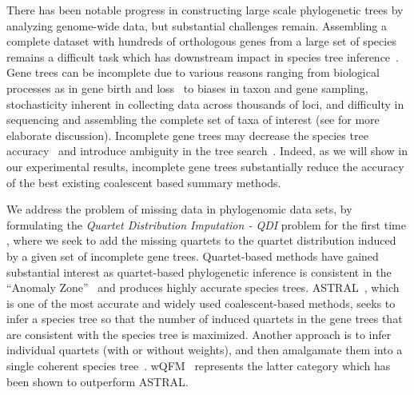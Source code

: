\documentclass[10pt,a4paper]{article}
\newcommand{\add}[1]{{\color{blue} #1}}
\begin{document}
There has been notable progress in constructing large scale phylogenetic trees by analyzing genome-wide data, but substantial challenges remain. Assembling a complete dataset with hundreds of orthologous genes from a large set of species remains a difficult task which has downstream impact in species tree inference~\cite{hosner2016avoiding,streicher2016should,xi2016impact}. Gene trees can be incomplete due to various reasons ranging from biological processes as in gene birth and loss~\cite{mgd-amb} to biases in taxon and gene sampling, stochasticity inherent in collecting data across thousands of loci, and difficulty in sequencing and assembling the complete set of taxa of interest (see \cite{hosner2016avoiding,streicher2016should,lemmon2009effect,burleigh2009inferring} for more elaborate discussion). Incomplete gene trees may decrease the species tree accuracy~\cite{bayzid-incomplete,xi2016impact,nute2018performance} and introduce ambiguity in the tree search~\cite{sanderson2011terraces,spterrace}. Indeed, as we will show in our experimental results, incomplete gene trees substantially reduce the accuracy of the best existing coalescent based summary methods.  

\add{We address the problem of missing data in phylogenomic data sets, by formulating the \textit{Quartet Distribution Imputation - \add{QDI}} problem for the first time}
, where we seek to add the missing quartets to the quartet distribution induced by a given set of incomplete gene trees. Quartet-based methods have gained substantial interest as  quartet-based phylogenetic inference is consistent in the ``Anomaly Zone''~\cite{DR06,DR09,degnan2013anomalous} and produces highly accurate species trees. ASTRAL~\cite{astral}, which is one of the most accurate and widely used coalescent-based methods, seeks to infer a species tree so that the number of induced quartets in the gene trees that are consistent with the species tree is maximized. Another approach is to infer individual quartets (with or without weights), and then amalgamate them into a single coherent species tree~\cite{strimmer_quartet_1996,tree-puzzle,ranwez2001quartet,snir_quartets_2008,qfm,wqmc,svdquartet,wqfm}. wQFM~\cite{wqfm} represents the latter category which has been shown to outperform ASTRAL.
\end{document}
